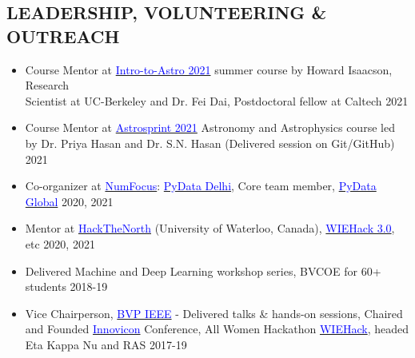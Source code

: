 \documentclass[11pt]{res} %
\newcommand{\titlegap}{5pt} %
\newcommand{\sectgap}{0.05in} %
\begin{document}
\begin{resume}
\section{LEADERSHIP, VOLUNTEERING \& OUTREACH}
\vspace{0.25in}
\begin{itemize}
    \item Course Mentor at \href{https://github.com/howardisaacson/Intro-to-Astro-2021}{\textcolor{blue}{Intro-to-Astro 2021}} summer course by Howard Isaacson, Research \\ Scientist at UC-Berkeley and Dr. Fei Dai, Postdoctoral fellow at Caltech \hfill 2021
    \item Course Mentor at \href{https://www.astrosprint2021.com/}{\textcolor{blue}{Astrosprint 2021}} Astronomy and Astrophysics course led \\
    by Dr. Priya Hasan and Dr. S.N. Hasan (Delivered session on Git/GitHub) \hfill 2021
    \item Co-organizer at \href{https://numfocus.org/}{\textcolor{blue}{NumFocus}}: \href{https://pydata.org/}{\textcolor{blue}{PyData Delhi}}, Core team member, \href{https://global.pydata.org}{\textcolor{blue}{PyData Global}} \hfill 2020, 2021
    \item Mentor at \href{https://hackthenorth.com/}{\textcolor{blue}{HackTheNorth}} (University of Waterloo, Canada), \href{https://wiehack.bvpieee.com/}{\textcolor{blue}{WIEHack 3.0}}, etc \hfill 2020, 2021
    \item Delivered Machine and Deep Learning workshop series, BVCOE for 60+ students \hfill 2018-19
    \item Vice Chairperson, \href{https://bvpieee.com/}{\textcolor{blue}{BVP IEEE}} - Delivered  talks \& hands-on sessions, Chaired \\ and Founded \href{https://innovicon.bvpieee.com}{\textcolor{blue}{Innovicon}} Conference, All Women Hackathon \href{https://wiehack.bvpieee.com}{\textcolor{blue}{WIEHack}}, headed \\ Eta Kappa Nu and RAS \hfill 2017-19
    
\end{itemize}


\vspace{\sectgap} 
\hline




\end{resume} 
\end{document}

